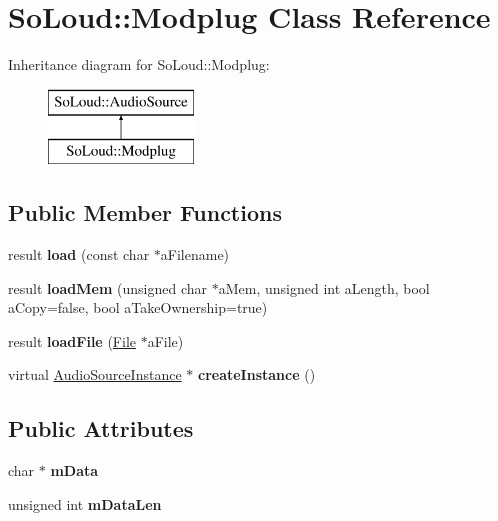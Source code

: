 \hypertarget{class_so_loud_1_1_modplug}{}\section{So\+Loud\+:\+:Modplug Class Reference}
\label{class_so_loud_1_1_modplug}
Inheritance diagram for So\+Loud\+:\+:Modplug\+:\begin{figure}[H]
\begin{center}
\leavevmode
\includegraphics[height=2.000000cm]{class_so_loud_1_1_modplug}
\end{center}
\end{figure}
\subsection*{Public Member Functions}
\begin{DoxyCompactItemize}
\item 
\mbox{\label{class_so_loud_1_1_modplug_a486803f7e617f4c6eafa9f96d87b7128}} 
result {\bfseries load} (const char $\ast$a\+Filename)
\item 
\mbox{\label{class_so_loud_1_1_modplug_a95562234f05f40ae86323e3b841321a3}} 
result {\bfseries load\+Mem} (unsigned char $\ast$a\+Mem, unsigned int a\+Length, bool a\+Copy=false, bool a\+Take\+Ownership=true)
\item 
\mbox{\label{class_so_loud_1_1_modplug_ac5c4205c9d33aef5bf79e0d1c2ad0596}} 
result {\bfseries load\+File} (\mbox{\hyperlink{class_so_loud_1_1_file}{File}} $\ast$a\+File)
\item 
\mbox{\label{class_so_loud_1_1_modplug_aa39d19fa443edc644f0863469158d28d}} 
virtual \mbox{\hyperlink{class_so_loud_1_1_audio_source_instance}{Audio\+Source\+Instance}} $\ast$ {\bfseries create\+Instance} ()
\end{DoxyCompactItemize}
\subsection*{Public Attributes}
\begin{DoxyCompactItemize}
\item 
\mbox{\label{class_so_loud_1_1_modplug_a4f810eeb4cd1a284f98bbb76cecfbe9f}} 
char $\ast$ {\bfseries m\+Data}
\item 
\mbox{\label{class_so_loud_1_1_modplug_a4a009a0351020a5cd02a7552310bdc32}} 
unsigned int {\bfseries m\+Data\+Len}
\end{DoxyCompactItemize}

